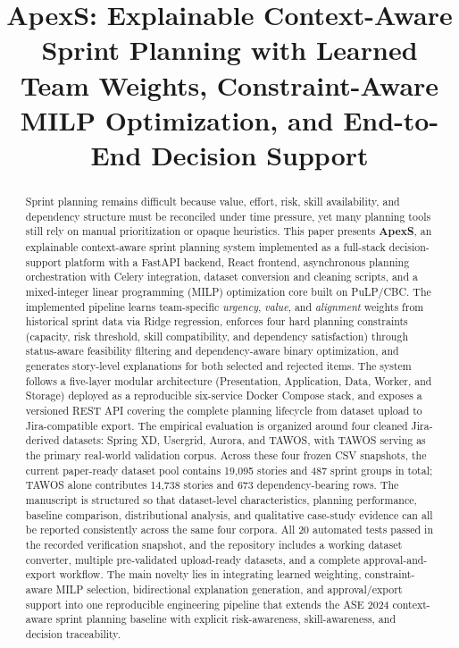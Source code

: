 \documentclass[conference]{IEEEtran}
\title{ApexS: Explainable Context-Aware Sprint Planning with Learned Team Weights,
       Constraint-Aware MILP Optimization, and End-to-End Decision Support}
\author{
\IEEEauthorblockN{Midhul Kiruthik M\textsuperscript{\dag},
                  Madhan Karthikeyan,
                  Manav Kaizen,
                  Sharvesh S}
\IEEEauthorblockA{
School of Computer Science and Engineering,
Vellore Institute of Technology, Chennai, India \\
Team ApexS, BCSE301P Software Engineering Lab, Winter Semester 2025--26 \\
Reg.\ Nos.: 23BCE0783\textsuperscript{\dag}, 23BCE0829, 23BCE2251, 23BCE2141 \\
\textsuperscript{\dag}Team Leader
}
}
\begin{document}
\maketitle

\begin{abstract}
Sprint planning remains difficult because value, effort, risk, skill availability,
and dependency structure must be reconciled under time pressure, yet many planning
tools still rely on manual prioritization or opaque heuristics.
%
This paper presents \textbf{ApexS}, an explainable context-aware sprint planning
system implemented as a full-stack decision-support platform with a FastAPI backend,
React frontend, asynchronous planning orchestration with Celery integration,
dataset conversion and cleaning scripts, and a mixed-integer linear programming
(MILP) optimization core built on PuLP/CBC.
%
The implemented pipeline learns team-specific \emph{urgency}, \emph{value}, and
\emph{alignment} weights from historical sprint data via Ridge regression, enforces
four hard planning constraints (capacity, risk threshold, skill compatibility, and
dependency satisfaction) through status-aware feasibility filtering and
dependency-aware binary optimization, and generates story-level explanations for
both selected and rejected items.
%
The system follows a five-layer modular architecture (Presentation, Application,
Data, Worker, and Storage) deployed as a reproducible six-service Docker Compose
stack, and exposes a versioned REST API covering the complete planning lifecycle
from dataset upload to Jira-compatible export.
%
The empirical evaluation is organized around four cleaned Jira-derived datasets:
Spring XD, Usergrid, Aurora, and TAWOS, with TAWOS serving as the primary
real-world validation corpus.
Across these four frozen CSV snapshots, the current paper-ready dataset pool
contains 19,095 stories and 487 sprint groups in total; TAWOS alone contributes
14,738 stories and 673 dependency-bearing rows.
The manuscript is structured so that dataset-level characteristics, planning
performance, baseline comparison, distributional analysis, and qualitative
case-study evidence can all be reported consistently across the same four corpora.
%
All 20 automated tests passed in the recorded verification snapshot, and the
repository includes a working dataset converter, multiple pre-validated
upload-ready datasets, and a complete approval-and-export workflow.
%
The main novelty lies in integrating learned weighting, constraint-aware MILP
selection, bidirectional explanation generation, and approval/export support into
one reproducible engineering pipeline that extends the ASE 2024 context-aware
sprint planning baseline with explicit risk-awareness, skill-awareness, and
decision traceability.
\end{abstract}
\end{document}
